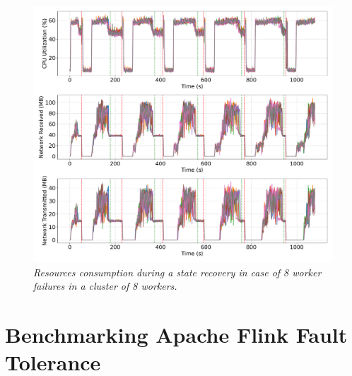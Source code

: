 \begin{figure}[ht]
    \centering
    \includegraphics[width=1\textwidth]{figures/kstreams-8pods/kafka_8_pods_resources}
    \caption{\textit{Resources consumption during a state recovery in case of 8 worker failures in a cluster of 8 workers.}}
    \label{fig:kafka-8pods-resource}
\end{figure}



\newpage
\section{Benchmarking Apache Flink Fault Tolerance}\label{sec:benchmarking-apache-flink-fault-tolerance}

